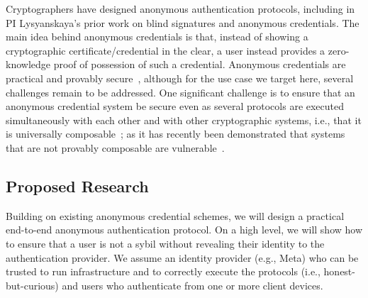 \documentclass[11pt]{article}
\begin{document}
Cryptographers have designed anonymous authentication protocols, including in PI Lysyanskaya’s prior work on blind signatures and anonymous credentials. The main idea behind anonymous credentials is that, instead of showing a cryptographic certificate/credential in the clear, a user instead provides a zero-knowledge proof of possession of such a credential.  Anonymous credentials are practical and provably secure~\cite{EC:camlys01,CCS:ballys13,hzblpb13}, although for the use case we target here, several challenges remain to be addressed. One significant challenge is to ensure that an anonymous credential system be secure even as several protocols are executed simultaneously with each other and with other cryptographic systems, i.e., that it is universally composable~\cite{FOCS:canetti01}; as it has recently been demonstrated that systems that are not provably composable are vulnerable~\cite{EC:BLLOR21}.

\subsection*{Proposed Research}
Building on existing anonymous credential schemes, we will design a practical end-to-end anonymous authentication protocol. On a high level, we will show how to ensure that a user is not a sybil without revealing their identity to the authentication provider. We assume an identity provider (e.g., Meta) who can be trusted to run infrastructure and to correctly execute the protocols (i.e., honest-but-curious) and users who authenticate from one or more client devices.
\end{document}
